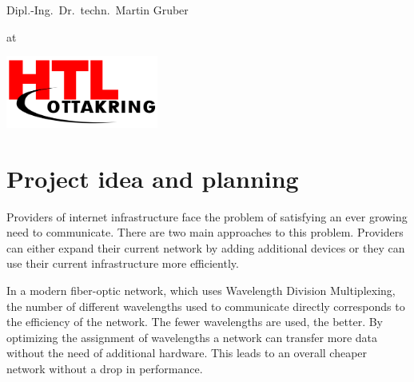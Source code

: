 \documentclass[paper=a4,fontsize=12pt]{scrartcl}
\begin{document}
\begin{titlepage}
\begin{center}
\vspace{5mm}

{\large Dipl.-Ing.\ Dr.\ techn.\ Martin Gruber}

\vspace{5mm}

at

\vspace{5mm}

\includegraphics[width=5cm]{../img/htl.png}

\vspace*{\fill}
\end{center}
\end{titlepage}
\tableofcontents
\newpage

\section{Project idea and planning}

Providers of internet infrastructure face the problem of satisfying an ever growing need to communicate. There are two main approaches to this problem. Providers can either expand their current network by adding additional devices or they can use their current infrastructure more efficiently.


In a modern fiber-optic network, which uses Wavelength Division Multiplexing, the number of different wavelengths used to communicate directly corresponds to the efficiency of the network. The fewer wavelengths are used, the better. By optimizing the assignment of wavelengths a network can transfer more data without the need of additional hardware. This leads to an overall cheaper network without a drop in performance.
\end{document}
